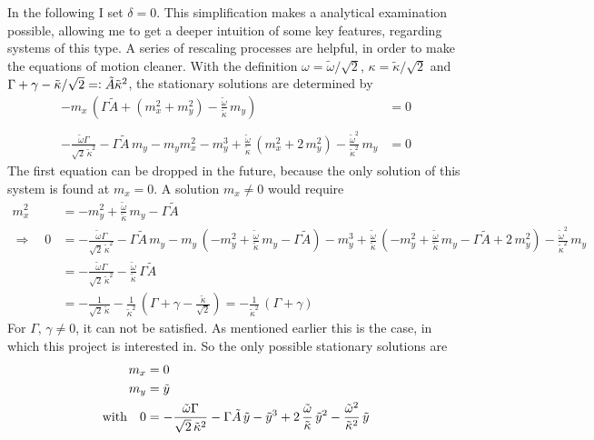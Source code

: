 In the following I set $\delta=0$. This simplification makes a analytical examination possible, allowing me to get a deeper intuition of some key features, regarding systems of this type. 
A series of rescaling processes are helpful, in order to make the equations of motion cleaner. With the definition $\omega=\tilde{\omega}/\sqrt{2}$, $\kappa=\tilde{\kappa}/\sqrt{2}$ and $\Gamma+\gamma-\tilde{\kappa}/\sqrt{2}=\vcentcolon \tilde{A}\tilde{\kappa}^2$, the stationary solutions are determined by
\begin{align*}
    -m_x\,\left(\Gamma\tilde{A}+( m_x^2+ m_y^2)-\frac{\tilde{\omega}}{\tilde{\kappa}}\,m_y\right)  &=0\\\\
    -\frac{\tilde{\omega}\Gamma}{\sqrt{2}\,\tilde{\kappa}^2}-\Gamma\tilde{A}\,m_y    -m_ym_x^2- m_y^3+\frac{\tilde{\omega}}{\tilde{\kappa}}\,(m_x^2+2\,m_y^2)-\frac{\tilde{\omega}^2}{\tilde{\kappa}^2}\,m_y  &=0
\end{align*}
The first equation can be dropped in the future, because the only solution of this system is found at $m_x=0$. A solution $m_x\neq0$ would require
\begin{align*}
    m_x^2&=-m_y^2+\frac{\tilde{\omega}}{\tilde{\kappa}}\,m_y-\Gamma\tilde{A} \\
    \Rightarrow\quad0&=-\frac{\tilde{\omega}\Gamma}{\sqrt{2}\,\tilde{\kappa}^2}-\Gamma\tilde{A}\,m_y    -m_y\,(-m_y^2+\frac{\tilde{\omega}}{\tilde{\kappa}}\,m_y-\Gamma\tilde{A})- m_y^3+\frac{\tilde{\omega}}{\tilde{\kappa}}\,(-m_y^2+\frac{\tilde{\omega}}{\tilde{\kappa}}\,m_y-\Gamma\tilde{A}+2\,m_y^2)-\frac{\tilde{\omega}^2}{\tilde{\kappa}^2}\,m_y  \\
    &=-\frac{\tilde{\omega}\Gamma}{\sqrt{2}\,\tilde{\kappa}^2}-\frac{\tilde{\omega}}{\tilde{\kappa}}\,\Gamma\tilde{A}\\
    &=-\frac{1}{\sqrt{2}\,\tilde{\kappa}}-\frac{1}{\tilde{\kappa}^2}\,(\Gamma+\gamma-\frac{\tilde{\kappa}}{\sqrt{2}})=-\frac{1}{\tilde{\kappa}^2}\,(\Gamma+\gamma)
\end{align*} 
For $\Gamma,\,\gamma\neq0$, it can not be satisfied. As mentioned earlier this is the case, in which this project is interested in. So the only possible stationary solutions are
\begin{align*}
    m_x&=0\\
    m_y&=\tilde{y}\\
    \text{with}\quad0&=-\frac{\tilde{\omega}\Gamma}{\sqrt{2}\,\tilde{\kappa}^2}-\Gamma\tilde{A}\,\tilde{y}    - \tilde{y}^3+2\,\frac{\tilde{\omega}}{\tilde{\kappa}}\,\tilde{y}^2-\frac{\tilde{\omega}^2}{\tilde{\kappa}^2}\,\tilde{y}  
\end{align*}
